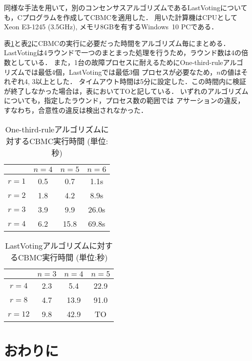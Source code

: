 \documentclass[technicalreport]{ieicej}
\theoremstyle{plain}
\begin{document}
同様な手法を用いて，別のコンセンサスアルゴリズムであるLastVoting\cite{HOjournal}についても，Cプログラムを作成してCBMCを適用した．
用いた計算機はCPUとしてXeon E3-1245 (3.5GHz), メモリ8GBを有するWindows~10 PCである．

表\ref{tab:onethird}と表\ref{tab:lastvoting}にCBMCの実行に必要だった時間をアルゴリズム毎にまとめる．
LastVotingは4ラウンドで一つのまとまった処理を行うため，ラウンド数は4の倍数としている．
また，1台の故障プロセスに耐えるためにOne-third-ruleアルゴリズムでは最低4個，LastVotingでは最低3個
プロセスが必要なため，$n$の値はそれぞれ4, 3以上とした．
タイムアウト時間は5分に設定した．この時間内に検証が終了しなかった場合は，表においてTOと記している．
いずれのアルゴリズムについても，指定したラウンド，プロセス数の範囲では
アサーションの違反，すなわち，合意性の違反は検出されなかった．

\begin{table}[t]
    \centering
    \caption{One-third-ruleアルゴリズムに対するCBMC実行時間 (単位:秒)}\label{tab:onethird}
    \begin{tabular}{cccc}
        \hline
                &  $n=4$ & $n = 5$ & $n = 6$ \\ \hline
       $r = 1$ &   0.5  &  0.7  &   1.1s   \\ 
       $r = 2$ &   1.8  &  4.2  &   8.9s   \\ 
       $r = 3$ &   3.9  &  9.9  &  26.0s   \\ 
       $r = 4$ &   6.2  & 15.8  &  69.8s   \\       
       \hline

    \end{tabular}
\end{table}
\begin{table}[t]
    \centering
    \caption{LastVotingアルゴリズムに対するCBMC実行時間 (単位:秒)}\label{tab:lastvoting}
    \begin{tabular}{cccc}
        \hline
        &  $n=3$ & $n = 4$ & $n = 5$ \\ \hline
        $r = 4$ &  2.3  &  5.4  &  22.9   \\ 
        $r = 8$ &  4.7  & 13.9  &  91.0   \\ 
        $r = 12$ & 9.8  & 42.9  &  TO   \\ 
        \hline
    \end{tabular}
\end{table}

\section{おわりに}\label{sec:conclusion}
\end{document}
